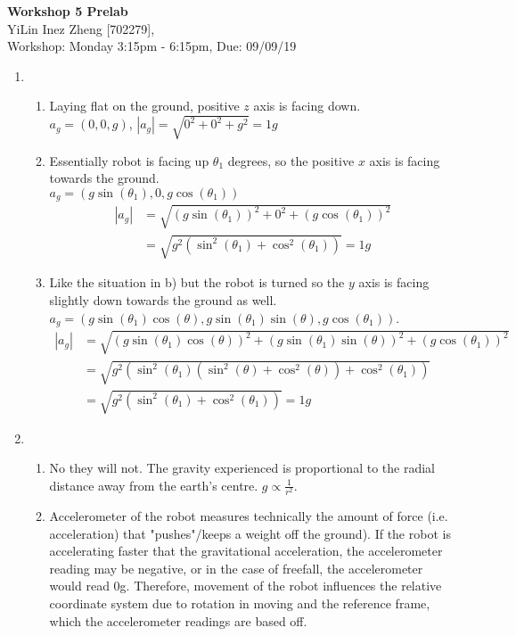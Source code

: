 \documentclass[11pt]{article}
\begin{document}
\begin{center}
\textbf{\Large{Workshop 5 Prelab}}\\
YiLin Inez Zheng [702279], \\
Workshop: Monday 3:15pm - 6:15pm, Due: 09/09/19  
\end{center}

\begin{enumerate}
    \item %
    \begin{enumerate}
        \item %
        Laying flat on the ground, positive $z$ axis is facing down.\\
        $a_g = (0,0,g)$, $|a_g| = \sqrt{0^2 + 0^2 + g^2} = 1g$
        \item %
        Essentially robot is facing up $\theta_1$ degrees, so the positive $x$ axis is facing towards the ground.\\
        $a_g = (g\sin(\theta_1),0,g\cos(\theta_1))$
        \begin{align*}
            |a_g| &= \sqrt{(g\sin(\theta_1))^2 + 0^2 + (g\cos(\theta_1))^2}\\
            &= \sqrt{g^2(\sin^2(\theta_1)+\cos^2(\theta_1))} = 1g
        \end{align*}
        \item %
        Like the situation in b) but the robot is turned so the $y$ axis is facing slightly down towards the ground as well.\\
        $a_g = (g\sin(\theta_1)\cos(\theta),g\sin(\theta_1)\sin(\theta),g\cos(\theta_1))$.
        \begin{align*}
            |a_g| &= \sqrt{(g\sin(\theta_1)\cos(\theta))^2 + (g\sin(\theta_1)\sin(\theta))^2 + (g\cos(\theta_1))^2}\\
            &= \sqrt{g^2(\sin^2(\theta_1)(\sin^2(\theta) + \cos^2(\theta))+\cos^2(\theta_1))}\\ 
            &= \sqrt{g^2(\sin^2(\theta_1)+\cos^2(\theta_1))} = 1g
        \end{align*}
    \end{enumerate}
    \item %
    \begin{enumerate}
        \item %
        No they will not. The gravity experienced is proportional to the radial distance away from the earth's centre. $g \propto \frac{1}{r^2}$.
        \item %
        Accelerometer of the robot measures technically the amount of force (i.e. acceleration) that "pushes"/keeps a weight off the ground). If the robot is accelerating faster that the gravitational acceleration, the accelerometer reading may be negative, or in the case of freefall, the accelerometer would read 0g. Therefore, movement of the robot influences the relative coordinate system due to rotation in moving and the reference frame, which the accelerometer readings are based off. 

\end{enumerate}
\end{enumerate}
\end{document}
